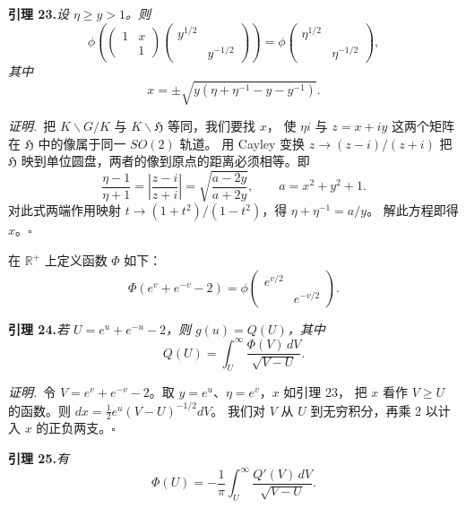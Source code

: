 \par\medskip\noindent\textbf{引理 23.}\quad\emph{设 $\eta\ge y>1$。则}
\[
\phi\!\left(\begin{pmatrix}1&x\\&1\end{pmatrix}
\begin{pmatrix}y^{1/2}&\\&y^{-1/2}\end{pmatrix}\right)
=\phi\begin{pmatrix}\eta^{1/2}&\\&\eta^{-1/2}\end{pmatrix},
\]
\emph{其中}
\[
x=\pm\sqrt{y(\eta+\eta^{-1}-y-y^{-1})}.
\]

\smallskip
\noindent\emph{证明.}\ 把 $K\backslash G/K$ 与 $K\backslash\mathfrak{H}$ 等同，我们要找 $x$，
使 $\eta i$ 与 $z=x+iy$ 这两个矩阵在 $\mathfrak{H}$ 中的像属于同一 $SO(2)$ 轨道。
用 Cayley 变换 $z\to(z-i)/(z+i)$ 把 $\mathfrak{H}$ 映到单位圆盘，两者的像到原点的距离必须相等。即
\[
\frac{\eta-1}{\eta+1}=\left|\frac{z-i}{z+i}\right|=\sqrt{\frac{a-2y}{a+2y}},
\qquad a=x^{2}+y^{2}+1 .
\]
对此式两端作用映射 $t\to(1+t^{2})/(1-t^{2})$，得 $\eta+\eta^{-1}=a/y$。
解此方程即得 $x$。\hfill$\square$

在 $\mathbb{R}^{+}$ 上定义函数 $\Phi$ 如下：
\begin{equation}\tag{24}
\Phi(e^{v}+e^{-v}-2)=\phi\begin{pmatrix}e^{v/2}&\\&e^{-v/2}\end{pmatrix}.
\end{equation}

\par\medskip\noindent\textbf{引理 24.}\quad\emph{若 $U=e^{u}+e^{-u}-2$，则 $g(u)=Q(U)$，其中}
\begin{equation}\tag{25}
Q(U)=\int_{U}^{\infty}\frac{\Phi(V)\,dV}{\sqrt{V-U}} .
\end{equation}

\smallskip
\noindent\emph{证明.}\ 令 $V=e^{v}+e^{-v}-2$。取 $y=e^{u}$、$\eta=e^{v}$，$x$ 如引理 23，
把 $x$ 看作 $V\ge U$ 的函数。则 $dx=\tfrac12 e^{u}(V-U)^{-1/2}dV$。
我们对 $V$ 从 $U$ 到无穷积分，再乘 $2$ 以计入 $x$ 的正负两支。\hfill$\square$

\par\medskip\noindent\textbf{引理 25.}\quad\emph{有}
\begin{equation}\tag{26}
\Phi(U)=-\frac{1}{\pi}\int_{U}^{\infty}\frac{Q'(V)\,dV}{\sqrt{V-U}} .
\end{equation}

